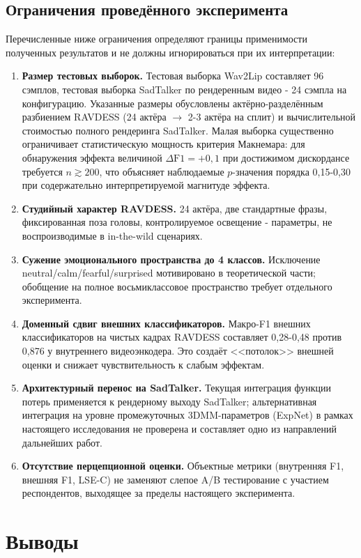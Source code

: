 \documentclass[a4paper, 12pt, oneside, openany]{article}
\begin{document}
\subsection{Ограничения проведённого эксперимента}

Перечисленные ниже ограничения определяют границы применимости полученных результатов и не должны игнорироваться при их интерпретации:
\begin{enumerate}
\item \textbf{Размер тестовых выборок.} Тестовая выборка Wav2Lip составляет 96 сэмплов, тестовая выборка SadTalker по рендеренным видео - 24 сэмпла на конфигурацию. Указанные размеры обусловлены актёрно-разделённым разбиением RAVDESS (24 актёра $\to$ 2-3 актёра на сплит) и вычислительной стоимостью полного рендеринга SadTalker. Малая выборка существенно ограничивает статистическую мощность критерия Макнемара: для обнаружения эффекта величиной $\Delta\text{F1}=+0{,}1$ при достижимом дискордансе требуется $n \gtrsim 200$, что объясняет наблюдаемые $p$-значения порядка 0,15-0,30 при содержательно интерпретируемой магнитуде эффекта.
\item \textbf{Студийный характер RAVDESS.} 24 актёра, две стандартные фразы, фиксированная поза головы, контролируемое освещение - параметры, не воспроизводимые в in-the-wild сценариях.
\item \textbf{Сужение эмоционального пространства до 4 классов.} Исключение neutral/calm/fearful/surprised мотивировано в теоретической части; обобщение на полное восьмиклассовое пространство требует отдельного эксперимента.
\item \textbf{Доменный сдвиг внешних классификаторов.} Макро-F1 внешних классификаторов на чистых кадрах RAVDESS составляет 0,28-0,48 против 0,876 у внутреннего видеоэнкодера. Это создаёт <<потолок>> внешней оценки и снижает чувствительность к слабым эффектам.
\item \textbf{Архитектурный перенос на SadTalker.} Текущая интеграция функции потерь применяется к рендерному выходу SadTalker; альтернативная интеграция на уровне промежуточных 3DMM-параметров (ExpNet) в рамках настоящего исследования не проверена и составляет одно из направлений дальнейших работ.
\item \textbf{Отсутствие перцепционной оценки.} Объектные метрики (внутренняя F1, внешняя F1, LSE-C) не заменяют слепое A/B тестирование с участием респондентов, выходящее за пределы настоящего эксперимента.
\end{enumerate}

\section{Выводы}
\end{document}
